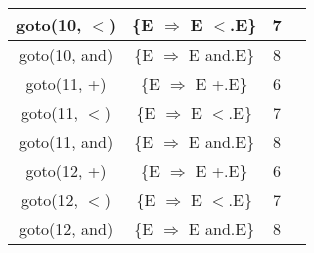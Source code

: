 \begin{table}[H]
\begin{minipage}[t]{.4\linewidth}
\begin{tabular}{|c|c|c|c|}
      \hline
      goto(10, $<$)	& \{E $\Rightarrow$ E $<$.E\} & 7 & \\
      \hline
      goto(10, and)	& \{E $\Rightarrow$ E and.E\} & 8 & \\
      \hline
      goto(11, +)	& \{E $\Rightarrow$ E +.E\} & 6 & \\
      \hline
      goto(11, $<$)	& \{E $\Rightarrow$ E $<$.E\} & 7 & \\
      \hline
      goto(11, and)	& \{E $\Rightarrow$ E and.E\} & 8 & \\
      \hline
      goto(12, +)	& \{E $\Rightarrow$ E +.E\} & 6 & \\
      \hline
      goto(12, $<$)	& \{E $\Rightarrow$ E $<$.E\} & 7 & \\
      \hline
      goto(12, and)	& \{E $\Rightarrow$ E and.E\} & 8 & \\
      \hline
    \end{tabular}
  \end{minipage}
\end{table}
